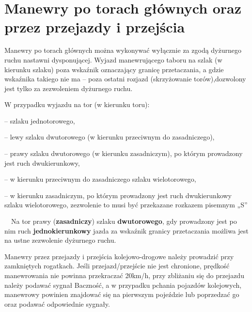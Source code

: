 \chapter{Manewry po torach głównych oraz przez przejazdy i przejścia}

Manewry po torach głównych można wykonywać wyłącznie za zgodą dyżurnego ruchu nastawni dysponującej. Wyjazd manewrującego taboru na szlak (w kierunku szlaku) poza
wskaźnik oznaczający granicę przetaczania, a gdzie wskaźnika takiego nie ma – poza ostatni rozjazd (skrzyżowanie torów),dozwolony jest tylko za zezwoleniem dyżurnego ruchu.

W przypadku wyjazdu na tor (w kierunku toru):

– szlaku jednotorowego,

– lewy szlaku dwutorowego (w kierunku przeciwnym do zasadniczego),

– prawy szlaku dwutorowego (w kierunku zasadniczym), po którym prowadzony jest ruch dwukierunkowy,

– w kierunku przeciwnym do zasadniczego szlaku wielotorowego,

– w kierunku zasadniczym, po którym prowadzony jest ruch dwukierunkowy szlaku wielotorowego, zezwolenie to musi być przekazane rozkazem pisemnym „S”

\ \ Na tor prawy (\textbf{zasadniczy}) szlaku \textbf{dwutorowego}, gdy prowadzony jest po nim ruch \textbf{jednokierunkowy} jazda za wskaźnik granicy przetaczania możliwa jest na ustne zezwolenie dyżurnego ruchu.

Manewry przez przejazdy i przejścia kolejowo-drogowe należy prowadzić przy zamkniętych rogatkach. Jeśli przejazd/przejście nie jest chronione, prędkość manewrowania nie powinna przekraczać 20km/h, przy zbliżaniu się do przejazdu należy podawać sygnał Baczność, a w przypadku pchania pojazdów kolejowych, manewrowy powinien znajdować się na pierwszym pojeździe lub poprzedzać go oraz podawać odpowiednie sygnały.


